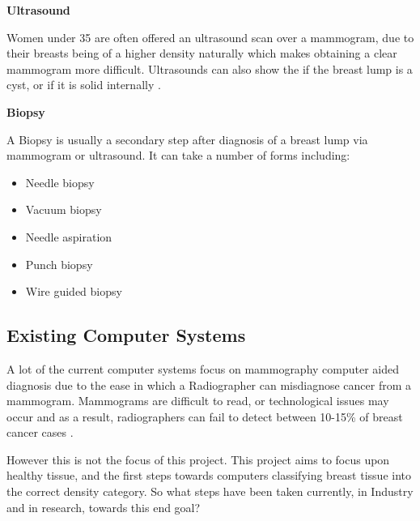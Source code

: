 \noindent \textbf{Ultrasound}

Women under 35 are often offered an ultrasound scan over a mammogram, due to their breasts being of a higher density naturally which makes obtaining a clear mammogram more difficult. Ultrasounds can also show the if the breast lump is a cyst, or if it is solid internally \cite{Cancer_Research_UK_2015}.

\noindent \textbf{Biopsy}

A Biopsy is usually a secondary step after diagnosis of a breast lump via mammogram or ultrasound. It can take a number of forms including:

\begin{itemize}
  \item Needle biopsy
  \item Vacuum biopsy
  \item Needle aspiration
  \item Punch biopsy
  \item Wire guided biopsy
\end{itemize}


\subsection{Existing Computer Systems}

A lot of the current computer systems focus on mammography computer aided diagnosis due to the ease in which a Radiographer can misdiagnose cancer from a mammogram. Mammograms are difficult to read, or technological issues may occur and as a result, radiographers can fail to detect between 10-15\% of breast cancer cases \cite{Champaign_Cederbom_2000}.

However this is not the focus of this project. This project aims to focus upon healthy tissue, and the first steps towards computers classifying breast tissue into the correct density category. So what steps have been taken currently, in Industry and in research, towards this end goal?


